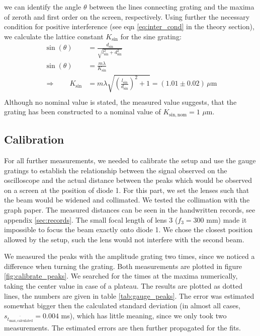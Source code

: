 we can identify the angle $\theta$ between the lines connecting grating and the maxima 
of zeroth and first order on the screen, respectively. Using further the 
necessary condition for positive interference (see eqn \eqref{eq:inter_cond} in the theory section), 
we calculate the lattice constant $K_\mathrm{sin}$ for the sine grating:
\begin{align}
    \sin(\theta)&= \frac{d_\mathrm{sin}}{\sqrt{l_\mathrm{sin}^2 + d_\mathrm{sin}^2}} \\
    \sin(\theta)&= \frac{m\lambda}{K_\mathrm{sin}} \\
    \Rightarrow \qquad 
    K_\mathrm{sin}    &= m \lambda\sqrt{\left(\frac{l_\mathrm{sin}}{d_\mathrm{sin}}\right)^2 + 1} 
        = (1.01 \pm 0.02) \, \mu\mathrm{m} \\
\end{align}
Although no nominal value is stated, the measured value suggests, that the grating has been 
constructed to a nominal value of $K_\mathrm{sin, nom} = 1$ $\mu$m. 

\subsection{Calibration}
For all further measurements, we needed to calibrate the setup and use the gauge gratings 
to establish the relationship between the signal observed on the oscilloscope and the 
actual distance between the peaks which would be observed on a screen at the position of diode 1. 
For this part, we set the lenses such that the beam would be widened and collimated. We tested the collimation 
with the graph paper. The measured distances can be seen in the handwritten records, see appendix \ref{sec:records}.
The small focal length of lens 3 ($f_3 = 300$ mm) made it impossible to focus the beam exactly onto diode 1. We 
chose the closest position allowed by the setup, such the lens would not interfere with the second beam. 

We measured the peaks with the amplitude grating two times, since we noticed a difference when turning the grating. 
Both measurements are plotted in figure \ref{fig:calibrate_peaks}. 
We searched for the times at the maxima numerically, taking the center value in case of a plateau. 
The results are plotted as dotted lines, the numbers are given in table \ref{tab:gauge_peaks}. 
The error was estimated somewhat bigger then the calculated standard deviation (in almost 
    all cases, $s_{\overline{t_\mathrm{max, calculated}}}  = 0.004$ ms), which has little meaning, 
since we only took two measurements. The estimated errors are then further propagated for the fits. 

